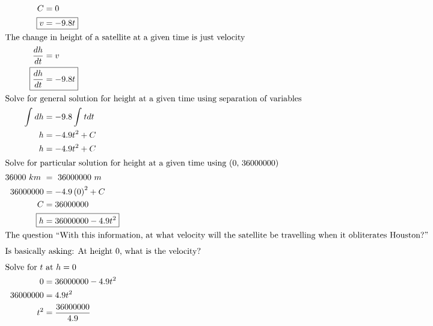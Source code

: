 \documentclass[12pt]{article}
\begin{document}
\begin{align}
  C                       & =0                                                                             \\
  \Aboxed{v               & =-9.8t}                                                                        \\
  \intertext{The change in height of a satellite at a given time is just velocity}
  \frac{dh}{dt}           & =v                                                                             \\
  \Aboxed{\frac{dh}{dt}   & =-9.8t}                                                                        \\
  \intertext{Solve for general solution for height at a given time using separation of variables}
  \int_{ }^{ }dh          & =-9.8\int_{ }^{ }tdt                                                           \\
  h                       & =-4.9t^{2}+C                                                                   \\
  h                       & =-4.9t^{2}+C                                                                   \\
  \intertext{Solve for particular solution for height at a given time using (0, 36000000)}
  36000\ km\              & =\ 36000000\ m                                                                 \\
  36000000                & =-4.9\left(0\right)^{2}+C                                                      \\
  C                       & =36000000                                                                      \\
  \Aboxed{h               & =36000000-4.9t^{2}}                                                            \\
  \intertext{The question ``With this information, at what velocity will the satellite be travelling when it obliterates Houston?''}
  \intertext{Is basically asking: At height 0, what is the velocity?}
  \intertext{Solve for $t$ at $h=0$}
  0                       & =36000000-4.9t^{2}                                                             \\
  36000000                & =4.9t^{2}                                                                      \\
  t^{2}                   & =\frac{36000000}{4.9}                                                          \\

\end{align}
\end{document}
